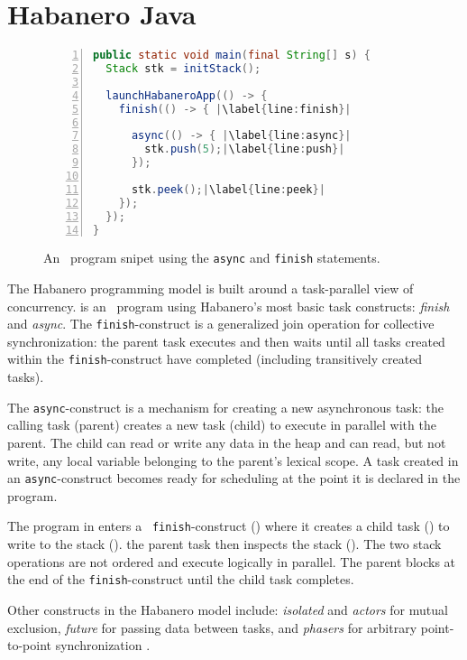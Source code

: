 \section{Habanero Java}

\begin{figure}
  \begin{center}
    \begin{lstlisting}[language=Java,escapechar=|,numbers=left,xleftmargin=18pt,numberstyle=\footnotesize]
public static void main(final String[] s) {
  Stack stk = initStack();
  
  launchHabaneroApp(() -> {
    finish(() -> { |\label{line:finish}|

      async(() -> { |\label{line:async}|
        stk.push(5);|\label{line:push}|
      });

      stk.peek();|\label{line:peek}|
    });
  });
}
\end{lstlisting}
  \end{center}
  \caption{An \hj\ program snipet using the \texttt{async} and \texttt{finish} statements.}
  \label{fig:hj-async-finish}
\end{figure}

The Habanero programming model is built around a task-parallel view of
concurrency.  is an \hj\ program using
Habanero's most basic task constructs: \emph{finish} and \emph{async}.
The \texttt{finish}-construct is a generalized join operation for
collective synchronization: the parent task executes and then waits
until all tasks created within the {\tt finish}-construct have completed
(including transitively created tasks). 

The \texttt{async}-construct is a mechanism for creating a new
asynchronous task: the calling task (parent) creates a new task
(child) to execute in parallel with the parent.  The child can read or
write any data in the heap and can read, but not write, any local
variable belonging to the parent's lexical scope. A task created in an
\texttt{async}-construct becomes ready for scheduling at the point it
is declared in the program.

The program in  enters a {\tt
  finish}-construct () where it creates a child task
() to write to the stack (). the
parent task then inspects the stack (). The two
stack operations are not ordered and execute logically in
parallel. The parent blocks at the end of the {\tt finish}-construct
until the child task completes.

Other constructs in the Habanero model include: \emph{isolated} and \emph{actors} for
mutual exclusion, \emph{future} for passing data between tasks, and
\emph{phasers} for arbitrary point-to-point synchronization
\cite{Cave:2011:HNA:2093157.2093165}.
